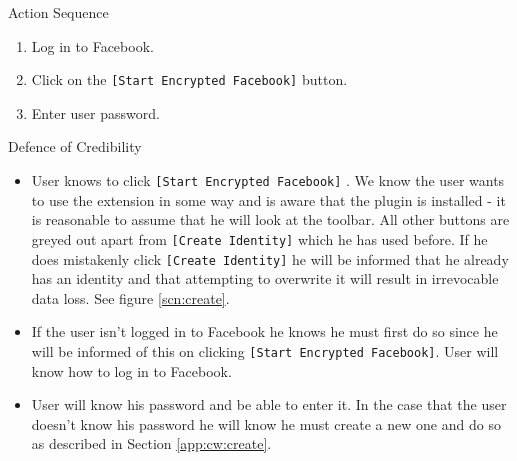 \begin{desc}

    \item[Action Sequence] \hfill
    
    \begin{enumerate}
        \item Log in to Facebook.
        \item Click on the {\tt [Start Encrypted Facebook]} button.
        \item Enter user password.
    \end{enumerate}
    
    \item[Defence of Credibility] \hfill
        \begin{itemize}
            
            \item User knows to click {\tt [Start Encrypted Facebook]} . We know the user wants to use the extension in some way and is aware that the plugin is installed - it is reasonable to assume that he will look at the toolbar. All other buttons are greyed out apart from {\tt [Create Identity]} which he has used before. If he does mistakenly click {\tt [Create Identity]} he will be informed that he already has an identity and that attempting to overwrite it will result in irrevocable data loss. See figure \ref{scn:create}.
            
            \item If the user isn't logged in to Facebook he knows he must first do so since he will be informed of this on clicking {\tt [Start Encrypted Facebook]}. User will know how to log in to Facebook.
            
            \item User will know his password and be able to enter it. In the case that the user doesn't know his password he will know he must create a new one and do so as described in Section \ref{app:cw:create}.
            
        \end{itemize}
\end{desc}

